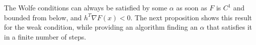 The Wolfe conditions
can always be satisfied by some $\alpha$ as soon as $F$ is $C^1$ and bounded from below, and $h^T \nabla F(x) < 0$.  
The next proposition shows this result for the weak condition, while providing an algorithm finding an $\alpha$ that satisfies it in a finite number of steps.
